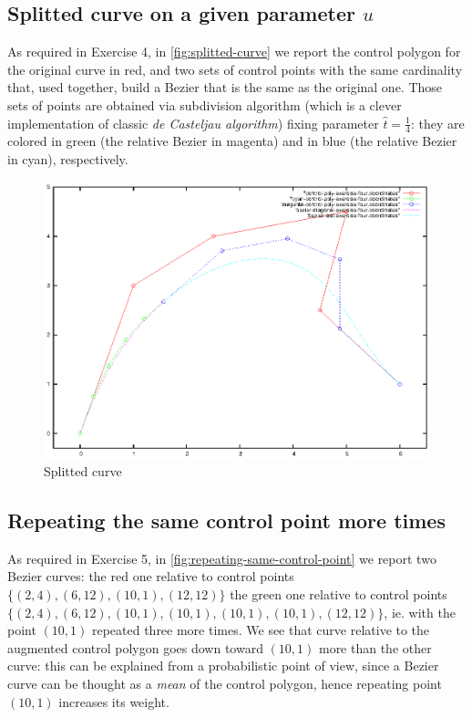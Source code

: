 \documentclass{article}
\begin{document}
\subsection{Splitted curve on a given parameter $u$}
As required in Exercise 4, in \autoref{fig:splitted-curve} we report
the control polygon for the original curve in red, and two sets of
control points with the same cardinality that, used together, build a
Bezier that is the same as the original one. Those sets of points are
obtained via subdivision algorithm (which is a clever implementation of
classic \emph{de Casteljau algorithm}) fixing parameter $\hat{t} =
\frac{1}{4}$: they are colored in green (the relative Bezier in magenta)
and in blue (the relative Bezier in cyan), respectively.
\begin{figure}[h!]
  \centering
  \includegraphics{bezier-deCasteljau-curves/exercise-four}
  \caption{Splitted curve}
  \label{fig:splitted-curve}
\end{figure}

\subsection{Repeating the same control point more times}
As required in Exercise 5, in
\autoref{fig:repeating-same-control-point} we report two Bezier curves: the
red one relative to control points $\{(2,4), (6,12), (10,1),
(12,12)\}$ the green one relative to control points $\{(2,4), (6,12),
(10,1), (10,1), (10,1), (10,1), (12,12)\}$, ie. with the point
$(10,1)$ repeated three more times. We see that curve relative to
the augmented control polygon goes down toward $(10,1)$ more than the
other curve: this can be explained from a probabilistic point of
view, since a Bezier curve can be thought as a \emph{mean} of the control
polygon, hence repeating point $(10,1)$ increases its weight.
\end{document}
